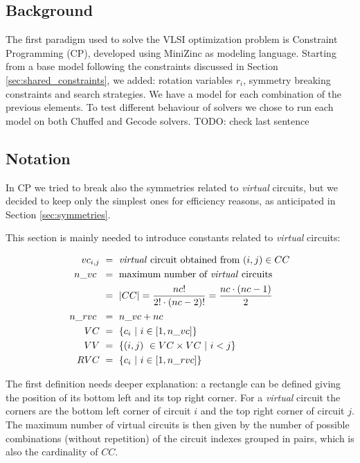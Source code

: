
\subsection{Background}
The first paradigm used to solve the VLSI optimization problem is Constraint Programming (CP),
developed using MiniZinc as modeling language.
Starting from a base model following the constraints discussed in Section \ref{sec:shared_constraints},
we added: rotation variables $r_i$, symmetry breaking constraints and search strategies. We have a model
for each combination of the previous elements.
To test different behaviour of solvers we chose to run each model on both Chuffed and Gecode solvers.
\colorbox{BurntOrange}{TODO: check last sentence}


\subsection{Notation} \label{sec:CP_notation}
In CP we tried to break also the symmetries related to \textit{virtual} circuits, but we decided to
keep only the simplest ones for efficiency reasons, as anticipated in Section \ref{sec:symmetries}.

This section is mainly needed to introduce constants related to \textit{virtual} circuits:

\begin{align*}
  vc_{i,j} & \ =\ \text{\textit{virtual} circuit obtained from  } (i,j) \in CC      \\
  n\_vc\   & \ =\ \text{maximum number of \textit{virtual} circuits}                \\
           & \ =\ |CC| = \frac{nc!}{2! \cdot (nc - 2)!} = \frac{nc \cdot (nc-1)}{2} \\
  n\_rvc\  & \ =\ n\_vc + nc                                                        \\
  VC       & \ =\ \{ c_i\ |\ i \in [1,n\_vc] \}                                     \\
  VV       & \ =\ \{ (i,j)\ \in VC \times VC\ |\ i <j \}                             \\
  RVC      & \ =\ \{ c_i\ |\ i \in [1,n\_rvc] \}                                    \\
\end{align*}

The first definition needs deeper explanation: a rectangle can be defined giving the position
of its bottom left and its top right corner. For a \textit{virtual} circuit the corners are the
bottom left corner of circuit $i$ and the top right corner of circuit $j$.
The maximum number of virtual circuits is then given by the number of possible combinations
(without repetition) of the circuit indexes grouped in pairs, which is also the cardinality of $CC$.



